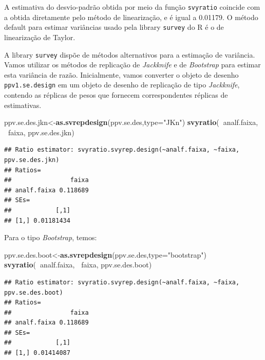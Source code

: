 \documentclass[]{book}
\newenvironment{Shaded}{\begin{snugshade}}{\end{snugshade}}
\newcommand{\KeywordTok}[1]{\textcolor[rgb]{0.13,0.29,0.53}{\textbf{#1}}}
\newcommand{\DataTypeTok}[1]{\textcolor[rgb]{0.13,0.29,0.53}{#1}}
\newcommand{\StringTok}[1]{\textcolor[rgb]{0.31,0.60,0.02}{#1}}
\newcommand{\OperatorTok}[1]{\textcolor[rgb]{0.81,0.36,0.00}{\textbf{#1}}}
\newcommand{\NormalTok}[1]{#1}
\theoremstyle{definition}
\theoremstyle{definition}
\theoremstyle{definition}
\theoremstyle{remark}
\begin{document}
A estimativa do desvio-padrão obtida por meio da função
\texttt{svyratio} coincide com a obtida diretamente pelo método de
linearização, e é igual a 0.01179. O método default para estimar
variâncias usado pela library \texttt{survey} \citep{R-survey} do R é o
de linearização de Taylor.

A library \texttt{survey} dispõe de métodos alternativos para a
estimação de variância. Vamos utilizar os métodos de replicação de
\emph{Jackknife} e de \emph{Bootstrap} para estimar esta variância de
razão. Inicialmente, vamos converter o objeto de desenho
\texttt{ppv1.se.design} em um objeto de desenho de replicação de tipo
\emph{Jackknife}, contendo as réplicas de pesos que fornecem
correspondentes réplicas de estimativas.

\begin{Shaded}
\begin{Highlighting}[]
\NormalTok{ppv.se.des.jkn<-}\KeywordTok{as.svrepdesign}\NormalTok{(ppv.se.des,}\DataTypeTok{type=}\StringTok{"JKn"}\NormalTok{)}
\KeywordTok{svyratio}\NormalTok{(}\OperatorTok{~}\NormalTok{analf.faixa, }\OperatorTok{~}\NormalTok{faixa, ppv.se.des.jkn)}
\end{Highlighting}
\end{Shaded}

\begin{verbatim}
## Ratio estimator: svyratio.svyrep.design(~analf.faixa, ~faixa, ppv.se.des.jkn)
## Ratios=
##                faixa
## analf.faixa 0.118689
## SEs=
##            [,1]
## [1,] 0.01181434
\end{verbatim}

Para o tipo \emph{Bootstrap}, temos:

\begin{Shaded}
\begin{Highlighting}[]
\NormalTok{ppv.se.des.boot<-}\KeywordTok{as.svrepdesign}\NormalTok{(ppv.se.des,}\DataTypeTok{type=}\StringTok{"bootstrap"}\NormalTok{)}
\KeywordTok{svyratio}\NormalTok{(}\OperatorTok{~}\NormalTok{analf.faixa, }\OperatorTok{~}\NormalTok{faixa, ppv.se.des.boot)}
\end{Highlighting}
\end{Shaded}

\begin{verbatim}
## Ratio estimator: svyratio.svyrep.design(~analf.faixa, ~faixa, ppv.se.des.boot)
## Ratios=
##                faixa
## analf.faixa 0.118689
## SEs=
##            [,1]
## [1,] 0.01414087
\end{verbatim}
\end{document}
